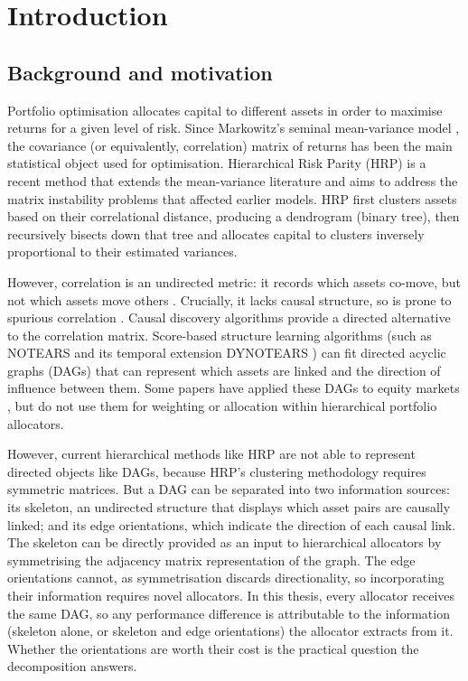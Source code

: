 \chapter{Introduction}
\label{chap:intro}

\section{Background and motivation}
\label{sec:motivation}

Portfolio optimisation allocates capital to different
assets in order to maximise returns for a given level of 
risk. Since Markowitz's seminal mean-variance model
\cite{markowitz1952portfolio}, the covariance
(or equivalently, correlation) matrix of returns has
been the main statistical object used for optimisation.
Hierarchical Risk Parity (HRP) is a recent
method \cite{lopezdeprado2016hrp} that extends the 
mean-variance literature and aims to address
the matrix instability problems that affected earlier 
models. HRP first clusters assets based on their 
correlational distance, producing a dendrogram (binary
tree), then recursively bisects down that tree and 
allocates capital to clusters inversely proportional
to their estimated variances.

However, correlation is an undirected metric: 
it records which assets co-move, but not which assets
move others \cite{lopezdeprado2023causal}. Crucially,
it lacks causal structure, so is prone to spurious
correlation \cite{simon1954spurious}.
Causal discovery algorithms provide a directed alternative
to the correlation matrix. Score-based structure learning algorithms
(such as NOTEARS \cite{zheng2018notears} and its temporal extension
DYNOTEARS \cite{pamfil2020dynotears}) can fit directed acyclic graphs
(DAGs) that can represent which assets are linked and the direction
of influence between them. Some papers have applied these DAGs to
equity markets \cite{howard2025causal,tang2024trading}, 
but do not use them for weighting or allocation within 
hierarchical portfolio allocators.

However, current hierarchical methods like HRP are not
able to represent directed objects like DAGs,
because HRP's clustering methodology requires symmetric matrices.
But a DAG can be separated into two information sources:
its skeleton, an undirected structure that displays which asset
pairs are causally linked; and its edge orientations, which indicate
the direction of each causal link. The skeleton can be directly
provided as an input to hierarchical allocators by symmetrising
the adjacency matrix representation of the graph. The edge
orientations cannot, as symmetrisation discards directionality,
so incorporating their information requires novel allocators.
In this thesis, every allocator receives the same DAG, so any
performance difference is attributable to the information (skeleton
alone, or skeleton and edge orientations) the allocator extracts from
it. Whether the orientations are worth their cost is the practical
question the decomposition answers.

